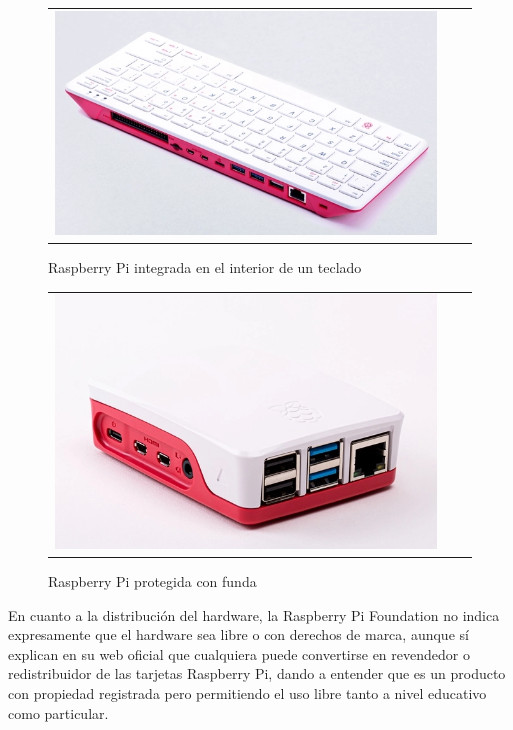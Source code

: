 \begin{figure}[h]
\centering
\begin{tabular}{ccc}
\includegraphics[scale=0.4]{archivos/rpi4keyboard.png}
\end{tabular}
\caption{Raspberry Pi integrada en el interior de un teclado}
\label{fig:rpi4keyboard}
\end{figure}
\begin{figure}[h]
\centering
\begin{tabular}{ccc}
\includegraphics[scale=0.4]{archivos/rpi4case.png}
\end{tabular}
\caption{Raspberry Pi protegida con funda}
\label{fig:rpi4case}
\end{figure}
\vspace{1em}
\par En cuanto a la distribución del hardware, la Raspberry Pi Foundation no indica expresamente que el hardware sea libre o con derechos de marca, aunque sí explican en su web oficial que cualquiera puede convertirse en revendedor o redistribuidor de las tarjetas Raspberry Pi, dando a entender que es un producto con propiedad registrada pero permitiendo el uso libre tanto a nivel educativo como particular.
